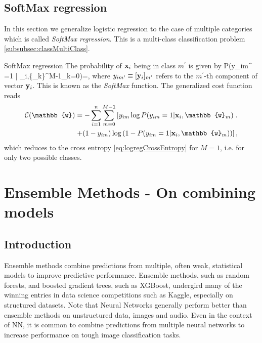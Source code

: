 \subsection{SoftMax regression}
\label{subsec:logregSoftMax}
In this section we generalize logistic regression to the case of multiple categories which is called \emph{SoftMax regression}. This is a multi-class classification problem \ref{subsubsec:classMultiClass}.
\begin{mybox}{SoftMax regression}
	The probability of $\mathbf{x}_i$ being in class $m^\prime$ is given by
	\be
	\label{eq:logregSoftMaxfct} 
	P(y_{im^\prime} =1 | \mx_i,\{_k\}^{M-1}_{k=0})=,
	\ee 
	where $y_{im^\prime} \equiv [\mathbf{y}_i]_{m^\prime}$ refers to the $m^\prime$-th component of vector $\mathbf{y}_i$. This is known as the \emph{SoftMax} function. The generalized cost function reads
	\begin{align}
	\label{eq:logregSoftMaxcostFct}
	\mC(\mathbb{w}) &= - \sum_{i=1}^n \sum_{m=0}^{M-1} \left[ y_{im} \log P(y_{im}=1|\mx_i, \mathbb{w}_m) \right.. \\
	&\left. + (1-y_{im }) \log\left(1-P(y_{im} =1 |\mx_i ,\mathbb{w}_m)\right)\right],
	\end{align} 
	which reduces to the cross entropy \ref{eq:logregCrossEntropy} for $M=1$, i.e. for only two possible classes.
\end{mybox}




\section{Ensemble Methods - On combining models}
\label{sec:ensembles}
\subsection{Introduction}
Ensemble methods combine predictions from multiple, often weak, statistical models to improve predictive performance. Ensemble methods, such as random forests, and boosted gradient trees, such as XGBoost, undergird many of the winning entries in data science competitions such as Kaggle, especially on structured datasets. Note that Neural Networks generally perform better than ensemble methods on unstructured data, images and audio. Even in the context of NN, it is common to combine predictions from multiple neural networks to increase performance on tough image classification tasks.

